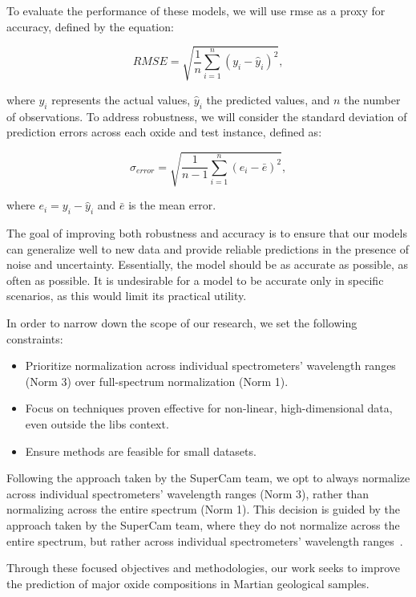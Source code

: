 To evaluate the performance of these models, we will use \gls{rmse} as a proxy for accuracy, defined by the equation:

\begin{equation}
    RMSE = \sqrt{\frac{1}{n} \sum_{i=1}^{n} (y_i - \hat{y}_i)^2},
\end{equation}

where $y_i$ represents the actual values, $\hat{y}_i$ the predicted values, and $n$ the number of observations.
To address robustness, we will consider the standard deviation of prediction errors across each oxide and test instance, defined as:

\begin{equation}
    \sigma_{error} = \sqrt{\frac{1}{n-1} \sum_{i=1}^{n} (e_i - \bar{e})^2},
\end{equation}

where $e_i = y_i - \hat{y}_i$ and $\bar{e}$ is the mean error.

The goal of improving both robustness and accuracy is to ensure that our models can generalize well to new data and provide reliable predictions in the presence of noise and uncertainty.
Essentially, the model should be as accurate as possible, as often as possible.
It is undesirable for a model to be accurate only in specific scenarios, as this would limit its practical utility.

In order to narrow down the scope of our research, we set the following constraints:
\begin{itemize}
    \item Prioritize normalization across individual spectrometers' wavelength ranges (Norm 3) over full-spectrum normalization (Norm 1).
    \item Focus on techniques proven effective for non-linear, high-dimensional data, even outside the \gls{libs} context.
    \item Ensure methods are feasible for small datasets.
\end{itemize}

Following the approach taken by the SuperCam team, we opt to always normalize across individual spectrometers' wavelength ranges (Norm 3), rather than normalizing across the entire spectrum (Norm 1).
This decision is guided by the approach taken by the SuperCam team, where they do not normalize across the entire spectrum, but rather across individual spectrometers' wavelength ranges~\cite{andersonPostlandingMajorElement2022}.

Through these focused objectives and methodologies, our work seeks to improve the prediction of major oxide compositions in Martian geological samples.